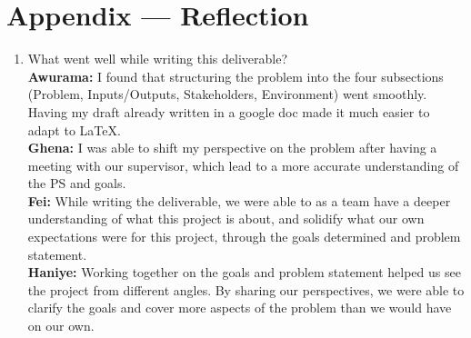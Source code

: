 \documentclass{article}
\begin{document}
\newpage{}

\section*{Appendix --- Reflection}


% 

\begin{enumerate}
    \item What went well while writing this deliverable? \\
    \textbf{Awurama:} I found that structuring the problem into the four subsections (Problem, Inputs/Outputs, Stakeholders, Environment) went smoothly. Having my draft already written in a google doc made it much easier to adapt to LaTeX. 
    \\\textbf{Ghena:} I was able to shift my perspective on the problem after having a meeting with our supervisor, which lead to a more accurate understanding of the PS and goals.
    \\\textbf{Fei:} While writing the deliverable, we were able to as a team have a deeper understanding of what this project is about, and solidify what our own expectations were for this project, through the goals determined and problem statement.
    \\\textbf{Haniye:} Working together on the goals and problem statement helped us see the project from different angles. By sharing our perspectives, we were able to clarify the goals and cover more aspects of the problem than we would have on our own.


\end{enumerate}
\end{document}
